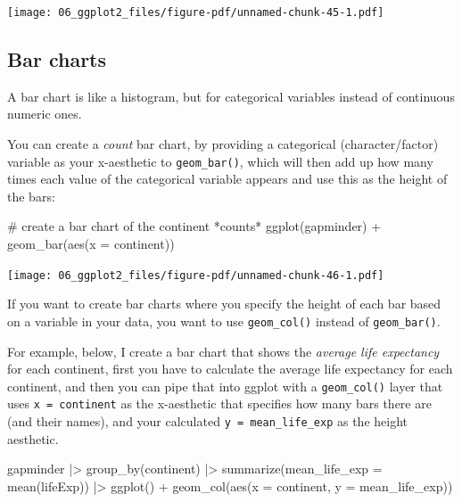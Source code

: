 \documentclass[
  letterpaper,
  DIV=11,
  numbers=noendperiod]{scrreprt}
\newenvironment{Shaded}{\begin{snugshade}}{\end{snugshade}}
\newcommand{\AttributeTok}[1]{\textcolor[rgb]{0.40,0.45,0.13}{#1}}
\newcommand{\CommentTok}[1]{\textcolor[rgb]{0.37,0.37,0.37}{#1}}
\newcommand{\FunctionTok}[1]{\textcolor[rgb]{0.28,0.35,0.67}{#1}}
\newcommand{\NormalTok}[1]{\textcolor[rgb]{0.00,0.23,0.31}{#1}}
\newcommand{\SpecialCharTok}[1]{\textcolor[rgb]{0.37,0.37,0.37}{#1}}
\begin{document}
\texttt{[image: 06\_ggplot2\_files/figure-pdf/unnamed-chunk-45-1.pdf]}

\subsection{Bar charts}\label{bar-charts}

A bar chart is like a histogram, but for categorical variables instead
of continuous numeric ones.

You can create a \emph{count} bar chart, by providing a categorical
(character/factor) variable as your x-aesthetic to \texttt{geom\_bar()},
which will then add up how many times each value of the categorical
variable appears and use this as the height of the bars:

\begin{Shaded}
\begin{Highlighting}[]
\CommentTok{\# create a bar chart of the continent *counts*}
\FunctionTok{ggplot}\NormalTok{(gapminder) }\SpecialCharTok{+}
  \FunctionTok{geom\_bar}\NormalTok{(}\FunctionTok{aes}\NormalTok{(}\AttributeTok{x =}\NormalTok{ continent))}
\end{Highlighting}
\end{Shaded}

\texttt{[image: 06\_ggplot2\_files/figure-pdf/unnamed-chunk-46-1.pdf]}

If you want to create bar charts where you specify the height of each
bar based on a variable in your data, you want to use
\texttt{geom\_col()} instead of \texttt{geom\_bar()}.

For example, below, I create a bar chart that shows the \emph{average
life expectancy} for each continent, first you have to calculate the
average life expectancy for each continent, and then you can pipe that
into ggplot with a \texttt{geom\_col()} layer that uses
\texttt{x\ =\ continent} as the x-aesthetic that specifies how many bars
there are (and their names), and your calculated
\texttt{y\ =\ mean\_life\_exp} as the height aesthetic.

\begin{Shaded}
\begin{Highlighting}[]
\NormalTok{gapminder }\SpecialCharTok{|\textgreater{}}
  \FunctionTok{group\_by}\NormalTok{(continent) }\SpecialCharTok{|\textgreater{}}
  \FunctionTok{summarize}\NormalTok{(}\AttributeTok{mean\_life\_exp =} \FunctionTok{mean}\NormalTok{(lifeExp)) }\SpecialCharTok{|\textgreater{}}
  \FunctionTok{ggplot}\NormalTok{() }\SpecialCharTok{+}
  \FunctionTok{geom\_col}\NormalTok{(}\FunctionTok{aes}\NormalTok{(}\AttributeTok{x =}\NormalTok{ continent, }\AttributeTok{y =}\NormalTok{ mean\_life\_exp))}
\end{Highlighting}
\end{Shaded}
\end{document}
